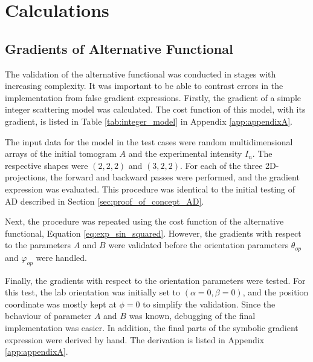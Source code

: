 
\chapter{Calculations}

\section{Gradients of Alternative Functional} %

The validation of the alternative functional was conducted in stages with increasing complexity.
It was important to be able to contrast errors in the implementation from false gradient expressions.
Firstly, the gradient of a simple integer scattering model was calculated. The cost function of this model, with its gradient, is listed in Table \ref{tab:integer_model} in Appendix \ref{app:appendixA}.



The input data for the model in the test cases were random multidimensional arrays of the initial tomogram $A$ and the experimental intensity $I_{n}$.
The respective shapes were $(2,2,2)$ and $(3,2,2)$.
For each of the three 2D-projections, the forward and backward passes were performed, and the gradient expression was evaluated. %
This procedure was identical to the initial testing of AD described in Section \ref{sec:proof_of_concept_AD}.

Next, the procedure was repeated using the cost function of the alternative functional, Equation \eqref{eq:exp_sin_squared}.
However, the gradients with respect to the parameters $A$ and $B$ were validated before the orientation parameters $\theta_{op}$ and $\varphi_{op}$ were handled.


Finally, the gradients with respect to the orientation parameters were tested.
For this test, the lab orientation was initially set to $\left( \alpha = 0, \beta = 0 \right)$, and the position coordinate was mostly kept at $\phi = 0$ to simplify the validation.
Since the behaviour of parameter $A$ and $B$ was known, debugging of the final implementation was easier. %
In addition, the final parts of the symbolic gradient expression were derived by hand. The derivation is listed in Appendix \ref{app:appendixA}.




